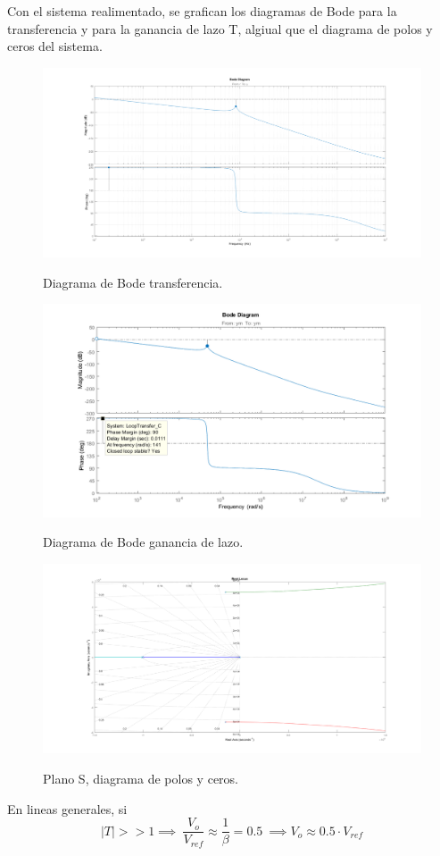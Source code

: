 Con el sistema realimentado, se grafican los diagramas de Bode para la transferencia y para la ganancia de lazo T, algiual que el diagrama de polos y ceros del sistema.
\begin{figure}[H]
	\centering
	\includegraphics[width=0.8\linewidth]{ImagenesParteIII/Bode.png}
	\label{fig:bode}
	\caption{Diagrama de Bode transferencia.}
\end{figure}
\begin{figure}[H]
	\centering
	\includegraphics[width=0.8\linewidth]{ImagenesParteIII/BodeT.png}
	\label{fig:bodeT}
	\caption{Diagrama de Bode ganancia de lazo.}
\end{figure}

\begin{figure}[H]
	\centering
	\includegraphics[width=0.8\linewidth]{ImagenesParteIII/Rlocus.png}
	\label{fig:zplane}
	\caption{Plano S, diagrama de polos y ceros.}
\end{figure}
En lineas generales, si 
\begin{equation}
|T| >> 1 \implies \ \frac{V_o}{V_{ref}} \approx \frac{1}{\beta} =  0.5 \ \implies V_o\approx 0.5 \cdot V_{ref} 
\end{equation}

